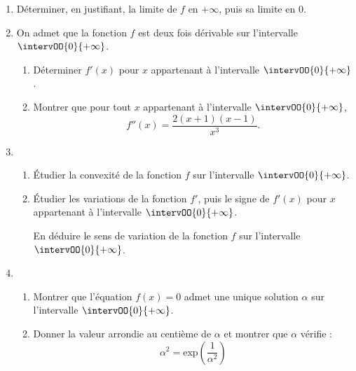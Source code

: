 \begin{enumerate}
	\item Déterminer, en justifiant, la limite de $f$ en $+\infty$, puis sa limite en 0.
	\item On admet que la fonction $f$ est deux fois dérivable sur l'intervalle $\intervOO{0}{+\infty}$.
	\begin{enumerate}
		\item Déterminer $f'(x)$ pour $x$ appartenant à l'intervalle $\intervOO{0}{+\infty}$.
		\item Montrer que pour tout $x$ appartenant à l'intervalle $\intervOO{0}{+\infty}$, \[ f''(x) = \frac{2(x+1)(x-1)}{x^3}. \]
	\end{enumerate}
	\item 
	\begin{enumerate}
		\item Étudier la convexité de la fonction $f$ sur l'intervalle $\intervOO{0}{+\infty}$.
		\item Étudier les variations de la fonction $f'$, puis le signe de $f'(x)$ pour $x$ appartenant à l'intervalle $\intervOO{0}{+\infty}$.
		
		En déduire le sens de variation de la fonction $f$ sur l'intervalle $\intervOO{0}{+\infty}$.
	\end{enumerate}
	\item 
	\begin{enumerate}
		\item Montrer que l'équation $f(x)=0$ admet une unique solution $\alpha$ sur l'intervalle $\intervOO{0}{+\infty}$.
		\item Donner la valeur arrondie au centième de $\alpha$ et montrer que $\alpha$ vérifie : \[ \alpha^2 = \text{exp}{\left(\frac{1}{\alpha^2}\right)} \]
	\end{enumerate}
\end{enumerate}